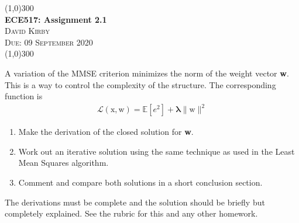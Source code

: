 \documentclass[11pt]{article}
\begin{document}
    \begin{center}
    \line(1,0){300}\\[0.25cm]
 	\Large{\bfseries ECE517: Assignment 2.1}\\
 	\textsc{\large David Kirby}\\
 	\textsc{\large Due: 09 September 2020}\\
 	\line(1,0){300}\\[0.75cm]
     \end{center}

\noindent A variation of the MMSE criterion minimizes the norm of the weight vector \textbf{w}. This is a way to control the complexity of the structure. The corresponding function is
\begin{align}
    \mathcal{L}\left(\bm{\mathrm {x,w}}\right)=\mathbb{E}\left[e^2 \right]+\bm{\lambda} \parallel \bm{\mathrm {w}}\parallel ^2
\end{align}
\begin{enumerate}
    \item Make the derivation of the closed solution for \textbf{w}.
    \item Work out an iterative solution using the same technique as used in the Least Mean Squares algorithm.
    \item Comment and compare both solutions in a short conclusion section.
\end{enumerate}
The derivations must be complete and the solution should be briefly but completely explained. See the rubric for this and any other homework.
\end{document}
